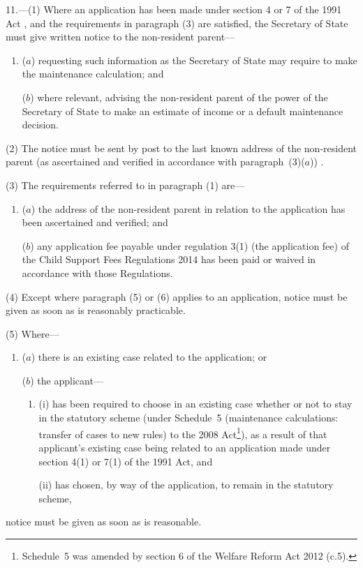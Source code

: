\documentclass[12pt,a4paper]{article}
\begin{document}
11.---(1)  Where an application has been made under section 4 or 7 of the 1991 Act%
, and the requirements in paragraph (3) are satisfied,  %
the Secretary of State must
give written notice to the non-resident parent—
\begin{enumerate}\item[]
($a$) requesting such information as the Secretary of State may require to make the maintenance calculation; and

($b$) where relevant, advising the non-resident parent of the power of the Secretary of State to make an estimate of income or a default maintenance decision.
\end{enumerate}

(2) The notice must be sent by post to the last known address of the non-resident parent
(as ascertained and verified in accordance with paragraph~(3)($a$))%
.

(3) The requirements referred to in paragraph (1) are—
\begin{enumerate}\item[]
($a$) the address of the non-resident parent in relation to the application has been ascertained and verified; and

($b$) any application fee payable under regulation 3(1) (the application fee) of the Child Support Fees Regulations 2014 has been paid or waived in accordance with those Regulations.
\end{enumerate}

(4) Except where paragraph (5) or (6) applies to an application, notice must be given as soon as is reasonably practicable.

(5) Where—
\begin{enumerate}\item[]
($a$) there is an existing case related to the application; or

($b$) the applicant—
\begin{enumerate}\item[]
(i) has been required to choose in an existing case whether or not to stay in the statutory scheme (under Schedule~5 (maintenance calculations: transfer of cases to new rules) to the 2008 Act\footnote{Schedule~5 was amended by section 6 of the Welfare Reform Act 2012 (c.5).}), as a result of that applicant’s existing case being related to an application made under section 4(1) or 7(1) of the 1991 Act, and

(ii) has chosen, by way of the application, to remain in the statutory scheme,
\end{enumerate}
\end{enumerate}
notice must be given as soon as is reasonable.
\end{document}

